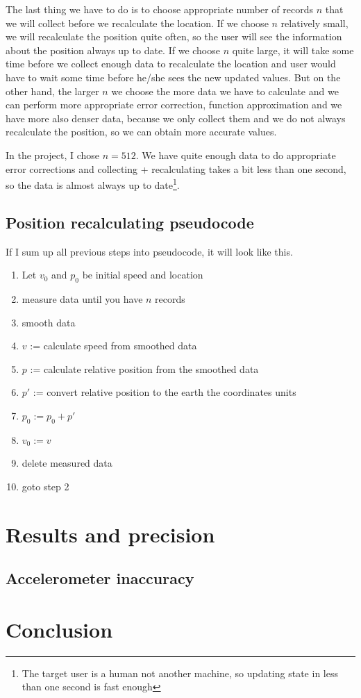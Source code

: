 \documentclass[hidelinks,a4paper]{article}
\begin{document}
The last thing we have to do is to choose appropriate number of records $n$ that we will collect before we recalculate the location. If we choose $n$ relatively small, we will recalculate the position quite often, so the user will see the information about the position always up to date. If we choose $n$ quite large, it will take some time before we collect enough data to recalculate the location and user would have to wait some time before he/she sees the new updated values. But on the other hand, the larger $n$ we choose the more data we have to calculate and we can perform more appropriate error correction, function approximation and we have more also denser data, because we only collect them and we do not always recalculate the position, so we can obtain more accurate values.\par
In the project, I chose $n = 512$. We have quite enough data to do appropriate error corrections and collecting + recalculating takes a bit less than one second, so the data is almost always up to date\footnote{The target user is a human not another machine, so updating state in less than one second is fast enough}.

\subsection{Position recalculating pseudocode}
If I sum up all previous steps into pseudocode, it will look like this.
\begin{enumerate}
    \item Let $v_0$ and $p_0$ be initial speed and location
    \item measure data until you have $n$ records
    \item smooth data
    \item $v$ := calculate speed from smoothed data
    \item $p$ := calculate relative position from the smoothed data
    \item $p'$ := convert relative position to the earth the coordinates units
    \item $p_0 := p_0 + p'$
    \item $v_0 := v$
    \item delete measured data
    \item goto step 2
\end{enumerate}


\section{Results and precision}
\subsection{Accelerometer inaccuracy}

\section{Conclusion}


\nocite{ACCGyro}
\nocite{BoardGH}
\nocite{NMEA}
\nocite{GYRO}
\printbibliography
\end{document}
